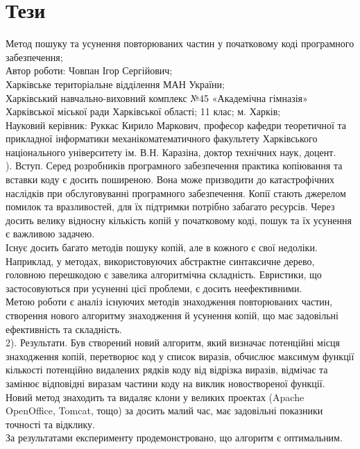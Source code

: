 \documentclass[a4paper, 14pt]{article}
\begin{document}
\section*{Т\lowercase{ези}}
Метод пошуку та усунення повторюваних частин у початковому коді програмного забезпечення; \\
Автор роботи: Човпан Ігор Сергійович; \\
Харківське територіальне відділення МАН України; \\
Харківський навчально-виховний комплекс №45 «Академічна гімназія»
Харківської міської ради Харківської області; 11 клас; м. Харків; \\
Науковий керівник: Руккас Кирило Маркович, професор кафедри теоретичної та прикладної інформатики механіко­математичного факультету Харківського національного університету ім. В.Н. Каразіна, доктор технічних наук, доцент. \\
\newline {}). Вступ. Серед розробників програмного забезпечення практика копіювання та вставки коду є досить поширеною. Вона може призводити до катастрофічних наслідків при обслуговуванні програмного забезпечення. Копії стають джерелом помилок та вразливостей, для їх підтримки потрібно забагато ресурсів.
Через досить велику відносну кількість копій у початковому коді, пошук та їх усунення є важливою задачею. \\
Існує досить багато методів пошуку копій, але в кожного є свої недоліки. Наприклад, у методах, використовуючих абстрактне синтаксичне дерево, головною перешкодою є завелика алгоритмічна складність. Евристики, що застосовуються при усуненні цієї проблеми, є досить неефективними. \\
Метою роботи є аналіз існуючих методів знаходження повторюваних частин, створення нового алгоритму знаходження й усунення копій, що має задовільні ефективність та складність. \\
2). Результати. Був створений новий алгоритм, який визначає потенційні місця знаходження копій, перетворює код у список виразів, обчислює максимум функції кількості потенційно видалених рядків коду від відрізка виразів, відмічає та замінює відповідні виразам частини коду на виклик новоствореної функції. \\
Новий метод знаходить та видаляє клони у великих проектах (Apache OpenOffice, Tomcat, тощо) за досить малий час, має задовільні показники точності та відклику. \\
За результатами експерименту продемонстровано, що алгоритм є оптимальним. \\
\newpage
\tableofcontents %
\newpage
\end{document}
